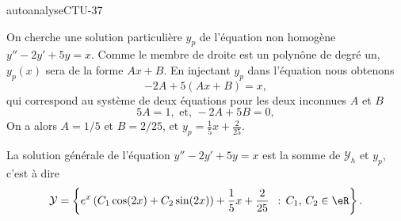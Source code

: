 \begin{corrige}{autoanalyseCTU-37}
\begin{enumerate}
\begin{enumerate}
On cherche une solution particulière $y_p$ de l'équation non homogène $y''-2y'+5y=x$. Comme le membre de droite est un polyn\^one de degré un, $y_p(x)$ sera  de la forme $Ax + B$. En injectant $y_p$ dans l'équation nous obtenons 
\begin{equation*}
  -2A + 5\left(Ax+B\right) = x,
\end{equation*}
qui correspond au système de deux équations pour les deux inconnues $A$ et $B$
\begin{equation*}
    5A =1 ,\text{ et, }-2A +5B = 0,
\end{equation*}
On a alors $A=1/5$ et $B=2/25$, et $y_p = \displaystyle \frac{1}{5}x +\frac{2}{25}$.

La solution générale de l'équation  $y''-2y'+5y=x$ est la somme de $\mathcal{Y}_h$ et $y_p$, c'est à dire 
\begin{equation*}
  \mathcal{Y} = \left\{ e^{x}\left(C_1\cos(2x) +C_2\sin(2x)\right)+ \frac{1}{5}x +\frac{2}{25} \ \,:\, C_1,\, C_2 \in \eR \right\}.
\end{equation*}


\end{enumerate}
\end{enumerate}
\end{corrige}
